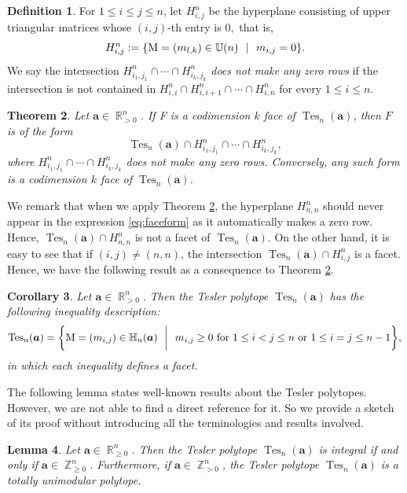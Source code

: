 \documentclass[12pt]{amsart}
\numberwithin{equation}{section}
\newtheorem{thm}{Theorem}[section]
\newtheorem{cor}[thm]{Corollary}
\newtheorem{lem}[thm]{Lemma}
\theoremstyle{definition}
\newtheorem{defn}[thm]{Definition}
\def\tes{\operatorname{Tes}}
\def\ba{{\boldsymbol{a}}}
\def\MM{{\rm{M}}}
\def\U{\operatorname{\mathbb{U}}}
\def\Z{\operatorname{\mathbb{Z}}}
\def\R{\operatorname{\mathbb{R}}}
\def\H{\mathbb{H}}
\begin{document}
\begin{defn}
For $1 \leq i \leq j \leq n$, let 
$H_{i,j}^n$ be the hyperplane consisting of upper triangular matrices whose $(i,j)$-th entry is $0,$ that is,
\begin{equation} \label{hyperplane}
H_{i,j}^{n}:=\{\MM=(m_{l,k}) \in \U(n)~~|~~m_{i,j}=0\}. 
\end{equation}
We say the intersection $H_{i_{1},j_{1}}^{n} \cap \cdots \cap H_{i_{k},j_{k}}^{n}$ \emph{does not make any zero rows} if the intersection is not contained in $H_{i,i}^{n} \cap H_{i,i+1}^{n} \cap \cdots \cap H_{i,n}^{n}$ for every $1 \leq i \leq n$.
\end{defn}
\begin{thm} \cite[Theorem 2.5]{Meszaros2017}\label{Tesler} 
	Let $\ba \in \R_{>0}^n$. If F is a codimension $k$ face of $\tes_n(\ba)$, then $F$ is of the form 
	    \begin{equation}
    \tes_n(\ba) \cap H_{i_{1},j_{1}}^{n} \cap \cdots \cap H_{i_{k},j_{k}}^{n},
		    \label{eq:faceform}
	    \end{equation}
		where $H_{i_{1},j_{1}}^{n} \cap \cdots \cap H_{i_{k},j_{k}}^{n}$ does not make any zero rows. Conversely, any such form is a codimension $k$ face of $\tes_{n}(\ba)$.

\end{thm}


We remark that when we apply Theorem \ref{Tesler}, the hyperplane $H_{n,n}^n$ should never appear in the expression \eqref{eq:faceform} as it automatically makes a zero row. Hence, $\tes_n(\ba) \cap H_{n,n}^n$ is not a facet of $\tes_n(\ba).$ On the other hand, it is easy to see that if $(i,j) \neq (n,n)$, the intersection $\tes_n(\ba) \cap H_{i,j}^n$ is a facet. Hence, we have the following result as a consequence to Theorem \ref{Tesler}.
\begin{cor}\label{cor:Tesler-ineq}
  Let $\ba \in \R_{>0}^n.$ Then the Tesler polytope $\tes_n(\ba)$ has the following inequality description:
\begin{equation*}
\tes_{n}(\ba) = \biggl\{\MM=(m_{i,j}) \in \H_n(\ba)~~\biggl{|}~~m_{i,j} \geq 0\text{  for } {1 \le i < j \le n \text{ or } 1 \leq i = j \leq n-1} \biggl\},
\end{equation*}
in which each inequality defines a facet.
\end{cor}

The following lemma states well-known results about the Tesler polytopes. However, we are not able to find a direct reference for it. So we provide a sketch of its proof without introducing all the terminologies and results involved. 
\begin{lem}\label{lem:tes-totaluni}
Let $\ba \in \R_{\ge 0}^n$. Then the Tesler polytope $\tes_n(\ba)$ is integral if and only if $\ba \in \Z_{\ge 0}^n$.
Furthermore, if $\ba \in \Z_{>0}^n$, the Tesler polytope $\tes_n(\ba)$ is a totally unimodular polytope.
\end{lem}
\end{document}
